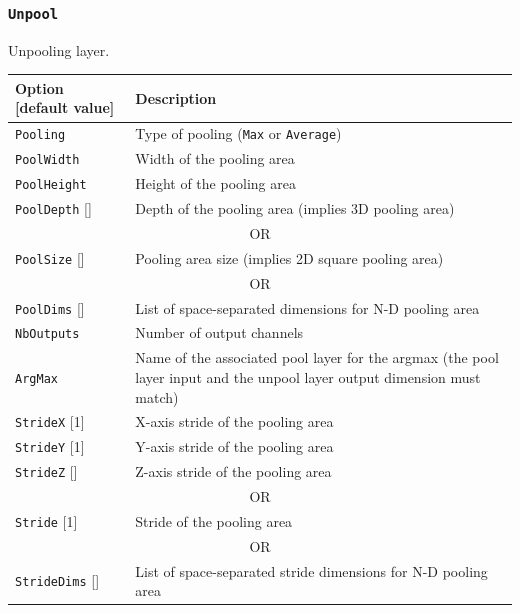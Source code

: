 \documentclass[a4paper,11pt,oneside]{article}
\begin{document}
\subsubsection{\texorpdfstring{%
\lstinline[basicstyle=\ttfamily\bfseries]!Unpool!}{Unpool}}
Unpooling layer.

\begin{center}
 \begin{longtable}{| p{5cm} | p{10cm} | }
 \hline
 Option [default value] & Description\\
 \hline\hline
  \cellcolor{requiredcolor}\lstinline!Pooling! & Type of pooling
  (\lstinline!Max! or \lstinline!Average!)\\
  \hline
  \cellcolor{requiredcolor}\lstinline!PoolWidth! & Width of the pooling area \\
  \cellcolor{requiredcolor}\lstinline!PoolHeight! & Height of the pooling area \\
  \lstinline!PoolDepth! [] & Depth of the pooling area (implies 3D pooling area) \\
  \multicolumn{2}{|c|}{\cellcolor{clrgray}\tiny OR} \\
  \cellcolor{requiredcolor}\lstinline!PoolSize! [] & Pooling area size (implies 2D square pooling area) \\
  \multicolumn{2}{|c|}{\cellcolor{clrgray}\tiny OR} \\
  \cellcolor{requiredcolor}\lstinline!PoolDims! [] & List of space-separated dimensions for N-D pooling area \\
  \hline
  \cellcolor{requiredcolor}\lstinline!NbOutputs! & Number of output channels \\
  \cellcolor{requiredcolor}\lstinline!ArgMax! & Name of the associated pool
  layer for the argmax (the pool layer input and the unpool layer output
  dimension must match) \\
  \hline
  \lstinline!StrideX! [1] & X-axis stride of the pooling area \\
  \lstinline!StrideY! [1] & Y-axis stride of the pooling area \\
  \lstinline!StrideZ! [] & Z-axis stride of the pooling area \\
  \multicolumn{2}{|c|}{\cellcolor{clrgray}\tiny OR} \\
  \lstinline!Stride! [1] & Stride of the pooling area \\
  \multicolumn{2}{|c|}{\cellcolor{clrgray}\tiny OR} \\
  \lstinline!StrideDims! [] & List of space-separated stride dimensions for N-D pooling area \\

\end{longtable}
\end{center}
\end{document}
